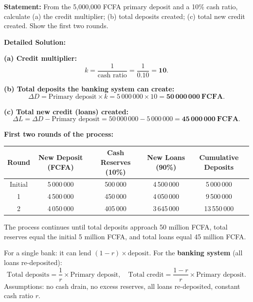 \documentclass[11pt]{article}
\begin{document}
\begin{exoresolu}
\textbf{Statement:} From the 5,000,000 FCFA primary deposit and a 10\% cash ratio, calculate (a) the credit multiplier; (b) total deposits created; (c) total new credit created. Show the first two rounds.

\tcblower
\textbf{Detailed Solution:}

\textbf{(a) Credit multiplier:}
\[
k = \frac{1}{\text{cash ratio}} = \frac{1}{0.10} = \mathbf{10}.
\]

\textbf{(b) Total deposits the banking system can create:}
\[
\Delta D = \text{Primary deposit} \times k = 5\,000\,000 \times 10 = \mathbf{50\,000\,000\ FCFA}.
\]

\textbf{(c) Total new credit (loans) created:}
\[
\Delta L = \Delta D - \text{Primary deposit} = 50\,000\,000 - 5\,000\,000 = \mathbf{45\,000\,000\ FCFA}.
\]

\textbf{First two rounds of the process:}

\begin{center}
\begin{tabular}{|c|c|c|c|c|}
\hline
\rowcolor{popblueL} \textbf{Round} & \textbf{New Deposit (FCFA)} & \textbf{Cash Reserves (10\%)} & \textbf{New Loans (90\%)} & \textbf{Cumulative Deposits} \\
\hline
Initial & 5\,000\,000 & 500\,000 & 4\,500\,000 & 5\,000\,000 \\
\hline
1 & 4\,500\,000 & 450\,000 & 4\,050\,000 & 9\,500\,000 \\
\hline
2 & 4\,050\,000 & 405\,000 & 3\,645\,000 & 13\,550\,000 \\
\hline
\end{tabular}
\end{center}

The process continues until total deposits approach 50 million FCFA, total reserves equal the initial 5 million FCFA, and total loans equal 45 million FCFA.

\begin{propriete}
For a single bank: it can lend $(1-r) \times \text{deposit}$.
For the \textbf{banking system} (all loans re-deposited):
\[
\text{Total deposits} = \frac{1}{r} \times \text{Primary deposit}, \quad
\text{Total credit} = \frac{1-r}{r} \times \text{Primary deposit}.
\]
Assumptions: no cash drain, no excess reserves, all loans re-deposited, constant cash ratio $r$.
\end{propriete}
\end{exoresolu}
\end{document}
